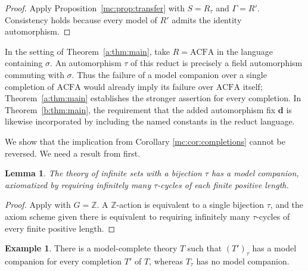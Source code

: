 \documentclass[10pt,a4paper]{amsart}
\newtheorem{lemma}[theorem]{Lemma}
\theoremstyle{definition}
\newtheorem{example}[theorem]{Example}
\newcommand{\Z}{\mathbb Z}
\newcommand{\bd}{\boldsymbol d}
\newcommand{\ACFA}{\mathrm{ACFA}}
\begin{document}
\begin{proof}
Apply Proposition~\ref{mc:prop:transfer} with $S=R_\tau$ and
$\Gamma=R'$. Consistency holds because every model of $R'$ admits
the identity automorphism.
\end{proof}

In the setting of Theorem~\ref{a:thm:main}, take $R=\ACFA$ in
the language containing $\sigma$. An automorphism $\tau$ of this
reduct is precisely a field automorphism commuting with $\sigma$.
Thus the failure of a model companion over a single completion of
$\ACFA$ would already imply its failure over $\ACFA$ itself;
Theorem~\ref{a:thm:main} establishes the stronger assertion for
every completion. In Theorem~\ref{b:thm:main}, the requirement that
the added automorphism fix $\bd$ is likewise incorporated by
including the named constants in the reduct language.

We show that the implication from Corollary \ref{mc:cor:completions} cannot be reversed. We need a result from \cite{HoffmannDynamics} first.
\begin{lemma}\label{mc:lem:permutations}
The theory of infinite sets with a bijection $\tau$ has a model
companion, axiomatized by requiring infinitely many $\tau$-cycles
of each finite positive length.
\end{lemma}

\begin{proof}
Apply \cite[Example~2.8]{HoffmannDynamics} with $G=\Z$.
A $\Z$-action is equivalent to a single bijection $\tau$,
and the axiom scheme given there is equivalent to requiring
infinitely many $\tau$-cycles of every finite positive length.
\end{proof}

\begin{example}\label{mc:ex:automorphisms}
There is a model-complete theory $T$ 
such that $(T')_\tau$ has a model companion for every completion
$T'$ of $T$, whereas $T_\tau$ has no model companion.
\end{example}
\end{document}
